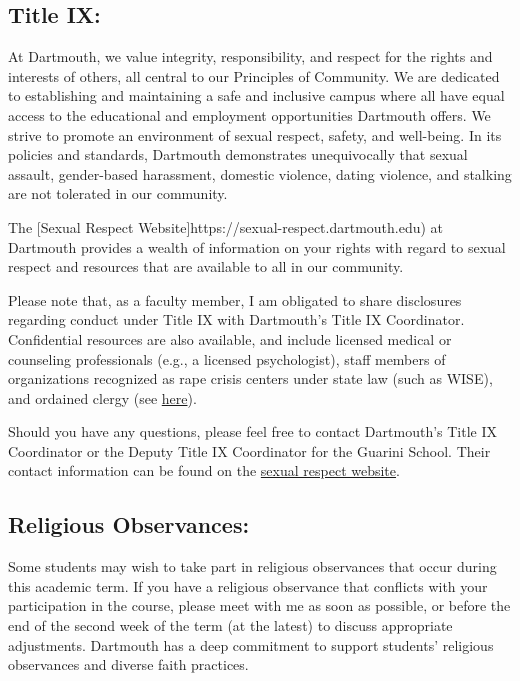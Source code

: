 \documentclass[11pt,letterpaper]{article}
\begin{document}
\subsection*{Title IX:}

At Dartmouth, we value integrity, responsibility, and respect for the rights and interests of others, all central to our Principles of Community. We are dedicated to establishing and maintaining a safe and inclusive campus where all have equal access to the educational and employment opportunities Dartmouth offers. We strive to promote an environment of sexual respect, safety, and well-being. In its policies and standards, Dartmouth demonstrates unequivocally that sexual assault, gender-based harassment, domestic violence, dating violence, and stalking are not tolerated in our community.

The [Sexual Respect Website]https://sexual-respect.dartmouth.edu) at Dartmouth provides a wealth of information on your rights with regard to sexual respect and resources that are available to all in our community.

Please note that, as a faculty member, I am obligated to share disclosures regarding conduct under Title IX with Dartmouth's Title IX Coordinator. Confidential resources are also available, and include licensed medical or counseling professionals (e.g., a licensed psychologist), staff members of organizations recognized as rape crisis centers under state law (such as WISE), and ordained clergy (see \href{https://eoatix.dartmouth.edu}{here}).

Should you have any questions, please feel free to contact Dartmouth's Title IX Coordinator or the Deputy Title IX Coordinator for the Guarini School. Their contact information can be found on the \href{https://sexual-respect.dartmouth.edu}{sexual respect website}.

\subsection*{Religious Observances:}

Some students may wish to take part in religious observances that occur during this academic term. If you have a religious observance that conflicts with your participation in the course, please meet with me as soon as possible, or before the end of the second week of the term (at the latest) to discuss appropriate adjustments. Dartmouth has a deep commitment to support students' religious observances and diverse faith practices.
\end{document}
